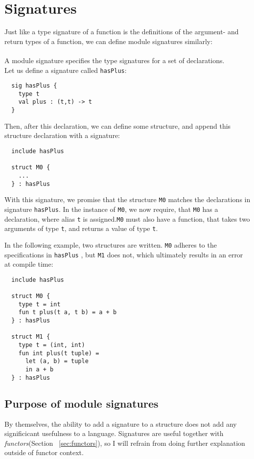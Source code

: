 \section{Signatures}
Just like a type signature of a function is the definitions of the argument- and
return types of a function, we can define module signatures similarly:\\\\
A module signature specifies the type signatures for a set of declarations.\\
Let us define a signature called \texttt{hasPlus}:
\begin{lstlisting}
  sig hasPlus {
    type t
    val plus : (t,t) -> t
  }
\end{lstlisting}

Then, after this declaration, we can define some structure, and append this
structure declaration with a signature:
\begin{lstlisting}
  include hasPlus
  
  struct M0 {
    ...
  } : hasPlus
\end{lstlisting}
With this signature, we promise that the structure \texttt{M0} matches the declarations
in signature \texttt{hasPlus}.
In the instance of \texttt{M0}, we now require, that \texttt{M0} has a
declaration, where alias \texttt{t} is assigned.\texttt{M0} must also have a
function, that takes two arguments of type \texttt{t}, and returns a value of
type \texttt{t}.

In the following example, two structures are written. \texttt{M0} adheres to the
specifications in \texttt{hasPlus} , but \texttt{M1} does not, which ultimately results in an
error at compile time:

\begin{lstlisting}
  include hasPlus
  
  struct M0 {
    type t = int
    fun t plus(t a, t b) = a + b
  } : hasPlus
  
  struct M1 {
    type t = (int, int)
    fun int plus(t tuple) =
      let (a, b) = tuple
      in a + b
  } : hasPlus
\end{lstlisting}
\subsection{Purpose of module signatures}
By themselves, the ability to add a signature to a structure does not add any
significicant usefulness to a language. Signatures are useful together with
\textit{functors}(Section ~\ref{sec:functors}), so I will refrain from doing further
explanation outside of functor context.


